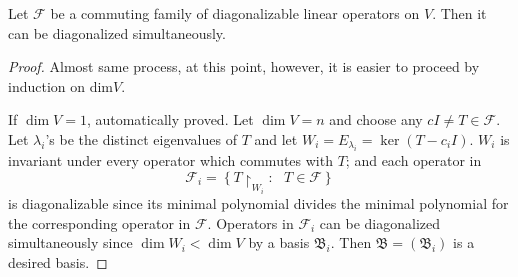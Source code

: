 \begin{theorem}Let $\mathscr F$ be a commuting family of diagonalizable linear operators on $V$. Then it can be diagonalized simultaneously.
\end{theorem}
\begin{proof}
Almost same process, at this point, however, it is easier to proceed by induction on dim$V$.

If $\operatorname{dim}V = 1$, automatically proved. Let $\operatorname{dim}V = n$ and choose any $cI \ne T\in\mathscr F$. Let $\lambda_i$'s be the distinct eigenvalues of $T$ and let $W_i = E_{\lambda_i} = \ker (T-c_i I).$ $W_i$ is invariant under every operator which commutes with $T$; and each operator in $$\mathscr F_i = \left\{T\upharpoonright_{W_i} : ~~~ T\in\mathscr F \right\}$$ is diagonalizable since its minimal polynomial divides the minimal polynomial for the corresponding operator in $\mathscr F$. Operators in $\mathscr F_i$ can be diagonalized simultaneously since $\operatorname{dim}W_i < \operatorname{dim}V$ by a basis $\mathfrak B_i$. Then $\mathfrak B = (\mathfrak B_i)$ is a desired basis.
\end{proof}